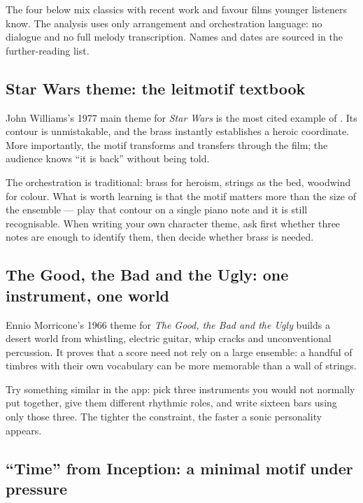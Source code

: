 The four below mix classics with recent work and favour films younger listeners know. The analysis uses only arrangement and orchestration language: no dialogue and no full melody transcription. Names and dates are sourced in the further-reading list.

\subsection{Star Wars theme: the leitmotif textbook}
\label{sec:film-case-starwars}

John Williams's 1977 main theme for \emph{Star Wars} is the most cited example of . Its contour is unmistakable, and the brass instantly establishes a heroic coordinate. More importantly, the motif transforms and transfers through the film; the audience knows ``it is back'' without being told.

The orchestration is traditional: brass for heroism, strings as the bed, woodwind for colour. What is worth learning is that the motif matters more than the size of the ensemble --- play that contour on a single piano note and it is still recognisable. When writing your own character theme, ask first whether three notes are enough to identify them, then decide whether brass is needed.

\subsection{The Good, the Bad and the Ugly: one instrument, one world}
\label{sec:film-case-morricone}

Ennio Morricone's 1966 theme for \emph{The Good, the Bad and the Ugly} builds a desert world from whistling, electric guitar, whip cracks and unconventional percussion. It proves that a score need not rely on a large ensemble: a handful of timbres with their own vocabulary can be more memorable than a wall of strings.

Try something similar in the app: pick three instruments you would not normally put together, give them different rhythmic roles, and write sixteen bars using only those three. The tighter the constraint, the faster a sonic personality appears.

\subsection{``Time'' from Inception: a minimal motif under pressure}
\label{sec:film-case-inception}

